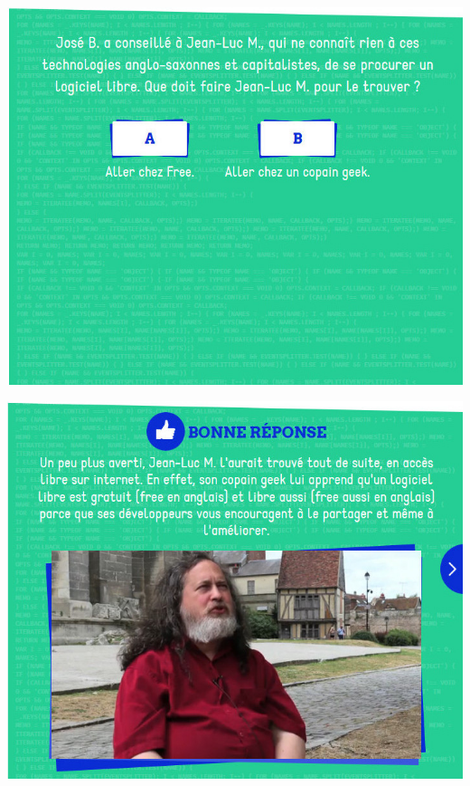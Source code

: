 \documentclass{beamer}
\begin{document}
\begin{frame}\includegraphics[scale=0.6] {./images/Quizz_HygieneNumerique_France4_24.jpg} \end{frame}
\begin{frame}\includegraphics[scale=0.6] {./images/Quizz_HygieneNumerique_France4_25.jpg} \end{frame}
\end{document}
